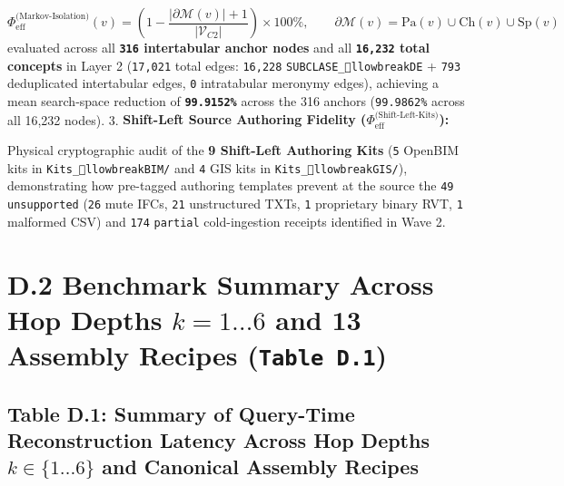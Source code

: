 \documentclass[10pt,a4paper]{article}
\begin{document}
\begin{equation*}
\Phi_{\text{eff}}^{\text{(Markov-Isolation)}}(v) = \left(1 - \frac{|\partial\mathcal{M}(v)| + 1}{|\mathcal{V}_{C2}|}\right) \times 100\%, \qquad \partial\mathcal{M}(v) = \text{Pa}(v) \cup \text{Ch}(v) \cup \text{Sp}(v)
\end{equation*}
evaluated across all \textbf{\texttt{316} intertabular anchor nodes} and all \textbf{\texttt{16,232} total concepts} in Layer 2 (\texttt{17,021} total edges: \texttt{16,228} \texttt{SUBCLASE\_llowbreak{}DE} + \texttt{793} deduplicated intertabular edges, \texttt{0} intratabular meronymy edges), achieving a mean search-space reduction of \textbf{\texttt{99.9152\%}} across the 316 anchors (\texttt{99.9862\%} across all 16,232 nodes).
3. \textbf{Shift-Left Source Authoring Fidelity ($\Phi_{\text{eff}}^{\text{(Shift-Left-Kits)}}$):}\par
Physical cryptographic audit of the \textbf{9 Shift-Left Authoring Kits} (\texttt{5} OpenBIM kits in \texttt{Kits\_llowbreak{}BIM/} and \texttt{4} GIS kits in \texttt{Kits\_llowbreak{}GIS/}), demonstrating how pre-tagged authoring templates prevent at the source the \texttt{49} \texttt{unsupported} (\texttt{26} mute IFCs, \texttt{21} unstructured TXTs, \texttt{1} proprietary binary RVT, \texttt{1} malformed CSV) and \texttt{174} \texttt{partial} cold-ingestion receipts identified in Wave 2.



\section*{D.2 Benchmark Summary Across Hop Depths $k = 1 \dots 6$ and 13 Assembly Recipes (\texttt{Table D.1})}

\subsection*{Table D.1: Summary of Query-Time Reconstruction Latency Across Hop Depths $k \in \{1 \dots 6\}$ and Canonical Assembly Recipes}
\end{document}
